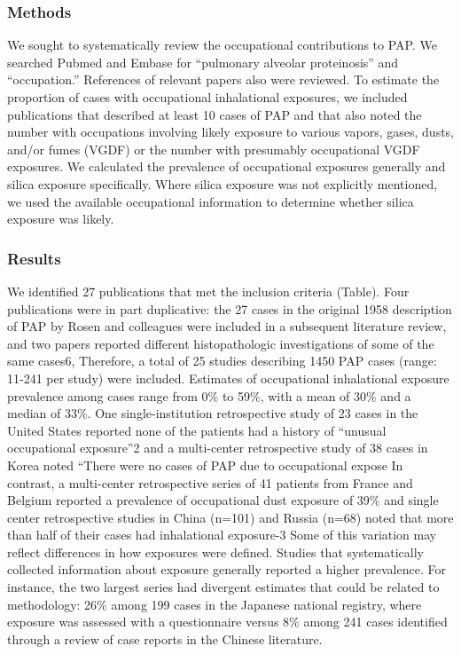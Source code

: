\documentclass[a4
er,12pt]{article}
\begin{document}
\subsubsection{Methods}
We sought to systematically review the occupational contributions to PAP.  We searched Pubmed and Embase for “pulmonary alveolar proteinosis” and “occupation.”  References of relevant papers also were reviewed.  To estimate the proportion of cases with occupational inhalational exposures, we included publications that described at least 10 cases of PAP and that also noted the number with occupations involving likely exposure to various vapors, gases, dusts, and/or fumes (VGDF) or the
number with presumably occupational VGDF exposures.  We calculated the prevalence of occupational exposures generally and silica exposure specifically.  Where silica exposure was not explicitly mentioned, we used the available occupational information to determine whether silica exposure was likely.  

\subsubsection{Results}
We identified 27 publications that met the inclusion criteria (Table).  Four publications were in part duplicative: the 27 cases in the original 1958 description of PAP by Rosen and colleagues were included in a subsequent literature review, and two papers reported different histopathologic investigations of some of the same cases6,  Therefore, a total of 25 studies describing 1450 PAP cases (range: 11-241 per study) were included.  Estimates of occupational inhalational exposure prevalence
among cases range from 0\% to 59\%, with a mean of 30\% and a median of 33\%.  One single-institution retrospective study of 23 cases in the United States reported none of the patients had a history of “unusual occupational exposure”2 and a multi-center retrospective study of 38 cases in Korea noted “There were no cases of PAP due to occupational expose  In contrast, a multi-center retrospective series of 41 patients from France and Belgium reported a prevalence of occupational dust exposure
of 39\% and single center retrospective studies in China (n=101) and Russia (n=68) noted that more than half of their cases had inhalational exposure-3  Some of this variation may reflect differences in how exposures were defined.  Studies that systematically collected information about exposure generally reported a higher prevalence.  For instance, the two largest series had divergent estimates that could be related to methodology: 26\% among 199 cases in the Japanese national
registry, where exposure was assessed with a questionnaire versus 8\% among 241 cases identified through a review of case reports in the Chinese literature.
\end{document}
